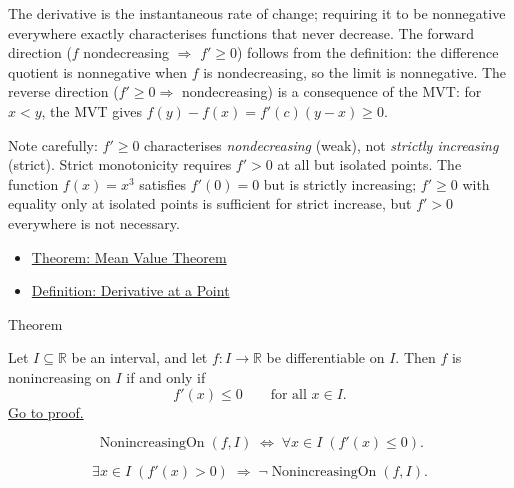 \begin{remark*}[Interpretation]
The derivative is the instantaneous rate of change; requiring it to be nonnegative everywhere exactly characterises functions that never decrease. The forward direction ($f$ nondecreasing $\Rightarrow$ $f' \geq 0$) follows from the definition: the difference quotient is nonnegative when $f$ is nondecreasing, so the limit is nonnegative. The reverse direction ($f' \geq 0 \Rightarrow$ nondecreasing) is a consequence of the MVT: for $x < y$, the MVT gives $f(y)-f(x) = f'(c)(y-x) \geq 0$.

Note carefully: $f' \geq 0$ characterises \emph{nondecreasing} (weak), not \emph{strictly increasing} (strict). Strict monotonicity requires $f' > 0$ at all but isolated points. The function $f(x) = x^3$ satisfies $f'(0) = 0$ but is strictly increasing; $f' \geq 0$ with equality only at isolated points is sufficient for strict increase, but $f' > 0$ everywhere is not necessary.
\end{remark*}

\begin{dependencies}
\begin{itemize}
  \item \hyperref[thm:mean-value-theorem]{Theorem: Mean Value Theorem}
  \item \hyperref[def:derivative-at-a-point]{Definition: Derivative at a Point}
\end{itemize}
\end{dependencies}


\begin{theorembox}{Theorem}
\begin{theorem}
\label{thm:nonincreasing-iff-nonpos-derivative}
Let $I \subseteq \mathbb{R}$ be an interval, and let $f : I \to \mathbb{R}$ be differentiable on $I$. Then $f$ is nonincreasing on $I$ if and only if
\[
f'(x) \leq 0 \qquad \text{for all } x \in I.
\]
\hyperref[prf:nonincreasing-iff-nonpos-derivative]{Go to proof.}
\end{theorem}
\end{theorembox}

\begin{remark*}
\[
\operatorname{NonincreasingOn}(f,I)
\;\iff\;
\forall x \in I\;(f'(x) \leq 0).
\]
\end{remark*}

\begin{remark*}
\[
\exists x \in I\;(f'(x) > 0) \;\Rightarrow\; \lnot\operatorname{NonincreasingOn}(f,I).
\]
\end{remark*}

